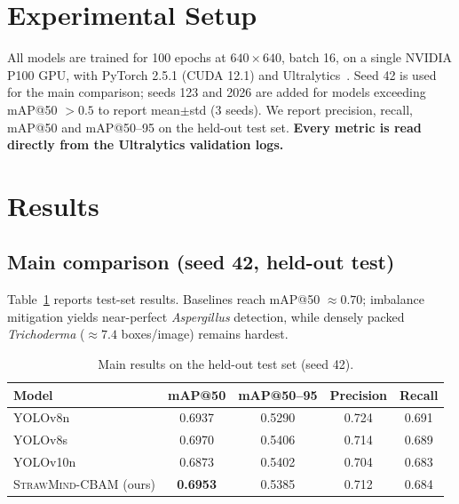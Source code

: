 \documentclass[11pt]{article}
\newcommand{\smc}{\textsc{StrawMind-CBAM}}
\begin{document}
\section{Experimental Setup}
All models are trained for 100 epochs at $640\times640$, batch 16, on a single NVIDIA P100 GPU,
with PyTorch 2.5.1 (CUDA 12.1) and Ultralytics~\cite{jocher2023yolov8}. Seed 42 is used for the main comparison; seeds
123 and 2026 are added for models exceeding mAP@50 $>0.5$ to report mean$\pm$std (3 seeds).
We report precision, recall, mAP@50 and mAP@50--95 on the held-out test set. \textbf{Every metric
is read directly from the Ultralytics validation logs.}

\section{Results}
\subsection{Main comparison (seed 42, held-out test)}
Table~\ref{tab:main} reports test-set results. Baselines reach mAP@50 $\approx0.70$; imbalance
mitigation yields near-perfect \emph{Aspergillus} detection, while densely packed \emph{Trichoderma}
($\approx 7.4$ boxes/image) remains hardest.
\begin{table}[t]\centering\small
\caption{Main results on the held-out test set (seed 42).}
\label{tab:main}
\begin{tabular}{lcccc}
\toprule
Model & mAP@50 & mAP@50--95 & Precision & Recall\\
\midrule
YOLOv8n            & 0.6937 & 0.5290 & 0.724 & 0.691\\
YOLOv8s            & 0.6970 & 0.5406 & 0.714 & 0.689\\
YOLOv10n           & 0.6873 & 0.5402 & 0.704 & 0.683\\
\smc{} (ours)      & \textbf{0.6953} & 0.5385 & 0.712 & 0.684\\
\bottomrule
\end{tabular}
\end{table}
\end{document}
